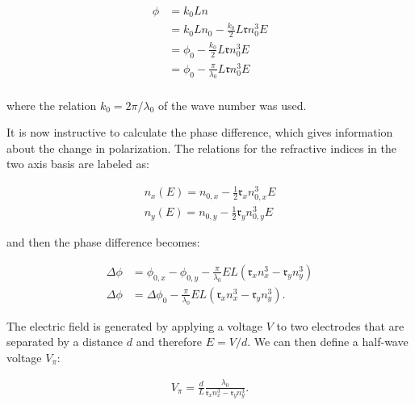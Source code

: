 \begin{align}
	\phi & = k_0 L n \\
		 & = k_0 L n_0 - \frac{k_0}{2} L \mathfrak{r} n_0^3 E \\
		 & = \phi_0 - \frac{k_0}{2} L \mathfrak{r} n_0^3 E \\
		 & = \phi_0 - \frac{\pi}{\lambda_0} L \mathfrak{r} n_0^3 E \\
\end{align}

where the relation $k_0 = 2 \pi / \lambda_0$ of the wave number was used.

It is now instructive to calculate the phase difference, which gives information about the change in polarization. The relations for the refractive indices in the two axis basis are labeled as:

\begin{align}
	n_x(E) = n_{0,x} - \frac{1}{2} \mathfrak{r}_x n_{0,x}^3 E \\
	n_y(E) = n_{0,y} - \frac{1}{2} \mathfrak{r}_y n_{0,y}^3 E
\end{align}

and then the phase difference becomes:

\begin{align}
	\Delta \phi & = \phi_{0,x} - \phi_{0,y} - \frac{\pi}{\lambda_0} E L \left(\mathfrak{r}_x n_x^3 - \mathfrak{r}_y n_y^3\right) \\
	\Delta \phi & = \Delta \phi_{0} - \frac{\pi}{\lambda_0} E L \left(\mathfrak{r}_x n_x^3 - \mathfrak{r}_y n_y^3\right) .
\end{align}

\begin{figure}[h]
\end{figure}

The electric field is generated by applying a voltage $V$ to two electrodes that are separated by a distance $d$ and therefore $E = V/d$. We can then define a half-wave voltage $V_\pi$:

\begin{align}
	V_\pi = \frac{d}{L} \frac{\lambda_0}{\mathfrak{r}_x n_x^3 - \mathfrak{r}_y n_y^3}.
\end{align}

